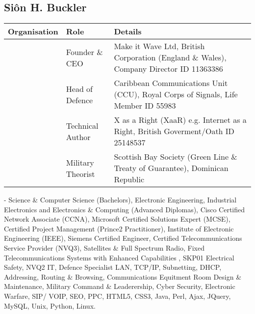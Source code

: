 \documentclass[letterpaper,10pt,openany,oneside,english]{sphinxmanual}
\begin{document}
\chapter{}
\label{\detokenize{index:document-author-s}}

\section{Siôn H. Buckler}
\label{\detokenize{index:sion-h-buckler}}

\begin{savenotes}\sphinxattablestart
\centering
\begin{tabulary}{\linewidth}[t]{|T|T|T|}
\hline
\sphinxstyletheadfamily 
Organisation
&\sphinxstyletheadfamily 
Role
&\sphinxstyletheadfamily 
Details
\\
\hline
\noindent{}
&
Founder \& CEO
&
Make it Wave Ltd, British Corporation (England \& Wales), Company Director ID 11363386
\\
\hline
\noindent{}
&
Head of Defence
&
Caribbean Communications Unit (CCU), Royal Corps of Signals, Life Member ID 55983
\\
\hline
\noindent{}
&
Technical Author
&
X as a Right (XaaR) e.g. Internet as a Right, British Goverment/Oath ID 25148537
\\
\hline
\noindent{}
&
Military Theorist
&
Scottish Bay Society (Green Line \& Treaty of Guarantee), Dominican Republic
\\
\hline
\end{tabulary}
\par
\sphinxattableend\end{savenotes}

 - Science \& Computer Science (Bachelors), Electronic Engineering, Industrial Electronics and Electronics \& Computing (Advanced Diplomas), Cisco Certified Network Associate (CCNA), Microsoft Certified Solutions Expert (MCSE), Certified Project Management (Prince2 Practitioner), Institute of Electronic Engineering (IEEE), Siemens Certified Engineer, Certified Telecommunications Service Provider (NVQ3), Satellites \& Full Spectrum Radio, Fixed Telecommunications Systems with Enhanced Capabilities , SKP01 Electrical Safety, NVQ2 IT, Defence Specialist LAN, TCP/IP, Subnetting, DHCP, Addressing, Routing \& Browsing, Communications Equitment Room Design \& Maintenance, Military Command \& Leaderership,  Cyber Security, Electronic Warfare, SIP/ VOIP, SEO, PPC, HTML5, CSS3, Java, Perl, Ajax, JQuery, MySQL, Unix, Python, Linux.



\renewcommand{\indexname}{Index}
\printindex
\end{document}
